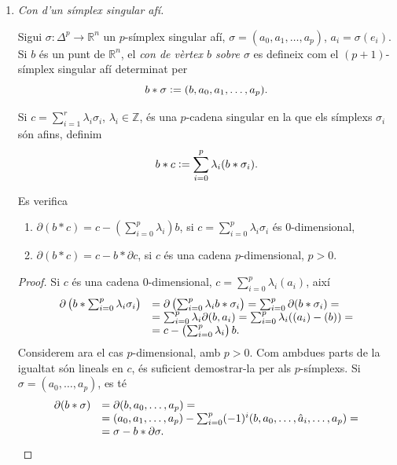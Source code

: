 \documentclass[../main.tex]{subfiles}
\begin{document}
\begin{enumerate}
    \item \textit{Con d'un símplex singular afí.}
    
    Sigui $\sigma:\Delta^p\rightarrow\mathbb{R}^n$ un $p$-símplex singular afí, $\sigma = (a_0,a_1,\ldots,a_p)$, $a_i = \sigma(e_i)$. Si $b$ és un punt de $\mathbb{R}^n$, el \textit{con de vèrtex $b$ sobre $\sigma$} es defineix com el $(p+1)$-símplex singular afí determinat per
    \begin{equation}
        \notag
        b*\sigma:=(b,a_0,a_1,\ldots,a_p).
    \end{equation}
    
    Si $c = \sum_{i=1}^r\lambda_i\sigma_i$, $\lambda_i\in\mathbb{Z}$, és una $p$-cadena singular en la que els símplexs $\sigma_i$ són afins, definim
    \begin{equation}
        \notag
        b*c:=\sum_{i=0}^p\lambda_i(b*\sigma_i).
    \end{equation}
    
    \begin{lema}
    Es verifica
    \begin{enumerate}
        \item $\partial(b*c) = c-\left(\sum_{i=0}^p\lambda_i\right)b$, si $c = \sum_{i=0}^p\lambda_i\sigma_i$ és $0$-dimensional,
        \item $\partial(b*c) = c-b*\partial c$, si $c$ és una cadena $p$-dimensional, $p>0$.
    \end{enumerate}
    \end{lema}
    \begin{proof}
    Si $c$ és una cadena $0$-dimensional, $c = \sum_{i=0}^p\lambda_i(a_i)$, així
    \begin{equation}
        \notag
        \begin{array}{ll}
            \partial\left(b*\sum_{i=0}^p\lambda_i\sigma_i\right) & = \partial\left(\sum_{i=0}^p\lambda_ib*\sigma_i\right) = \sum_{i=0}^p\partial(b*\sigma_i) = \\
            &= \sum_{i=0}^p\lambda_i\partial(b,a_i) = \sum_{i=0}^p\lambda_i((a_i)-(b)) = \\
            &= c-\left(\sum_{i=0}^p\lambda_i\right)b.
        \end{array}
    \end{equation}
    Considerem ara el cas $p$-dimensional, amb $p>0$. Com ambdues parts de la igualtat són lineals en $c$, és suficient demostrar-la per als $p$-símplexs. Si $\sigma = (a_0,\ldots,a_p)$, es té
    \begin{equation}
        \notag
        \begin{array}{ll}
            \partial(b*\sigma) & = \partial(b,a_0,\ldots,a_p) =  \\
             & = (a_0,a_1,\ldots,a_p)-\sum_{i=0}^p(-1)^{i}(b,a_0,\ldots,\hat{a}_i,\ldots,a_p) = \\
             & = \sigma-b*\partial\sigma.
        \end{array}
    \end{equation}
    \end{proof}
    

\end{enumerate}
\end{document}
